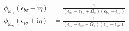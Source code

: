 \documentclass[12pt]{article}
\begin{document}
\begin{equation}
\begin{aligned}
\phi_{\omega_{11}}(\epsilon_{b \sigma } - \mathrm{i} \eta) & = \frac{1}{(\epsilon_{b \sigma} -\epsilon_{k \sigma}+\Omega_s)(\epsilon_{b \sigma} -\epsilon_{i \sigma})} \\
\phi_{\omega_{21}}(\epsilon_{i \sigma} + \mathrm{i} \eta) & = \frac{1}{(\epsilon_{i \sigma} -\epsilon_{c \sigma}-\Omega_s)(\epsilon_{i \sigma} -\epsilon_{b \sigma})}
\end{aligned}
\end{equation}
\end{document}
